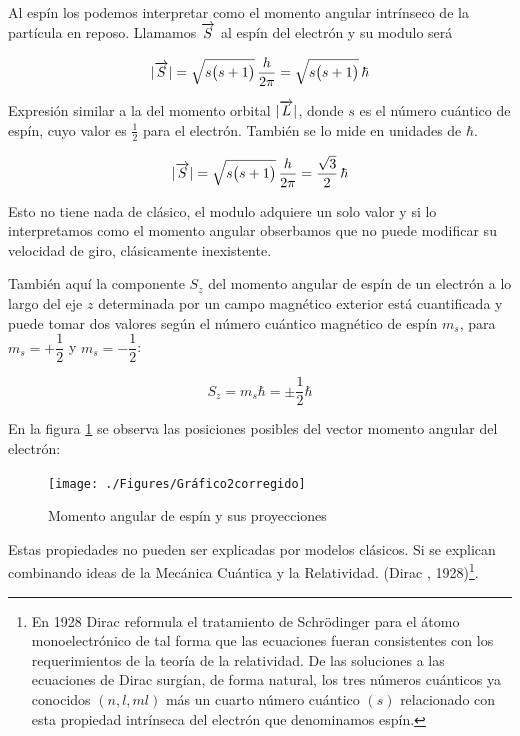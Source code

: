 Al espín los podemos interpretar como el momento angular intrínseco de la partícula en reposo. Llamamos $\overrightarrow{S}$ al espín del electrón y su modulo será

\begin{equation}
 |\overrightarrow{S}| = \sqrt{s \big(s+1\big) } \, \frac{h}{2 \pi } = \sqrt{s \big(s+1\big) } \,\hbar 
\end{equation}

Expresión similar a la del momento orbital $|\overrightarrow{L}|$, donde $s$ es el número cuántico de espín, cuyo valor es $\frac{1}{2}$ para el electrón. También se lo mide en unidades de $\hbar$.
 
\begin{equation}
 |\overrightarrow{S}| = \sqrt{s \big(s+1\big) } \, \frac{h}{2 \pi } = \frac{\sqrt{3}}{2}\, \hbar
\end{equation}

Esto no tiene nada de clásico, el modulo adquiere un solo valor y si lo interpretamos como el momento angular obserbamos que no puede modificar su velocidad de giro, clásicamente inexistente.

También aquí la componente $S_{z}$ del momento angular de espín de un electrón a lo largo del eje $z$ determinada por un campo magnético exterior está cuantificada y puede tomar dos valores según el número cuántico magnético de espín $m_{s}$, para $m_{s}=+\dfrac{1}{2}$ y $m_{s}=-\dfrac{1}{2}$:

\begin{equation}
 S_{z} = m_{s} \hbar = \pm \frac{1}{2} \hbar
\end{equation}

En la figura \ref{fig:Gráfico2corregido} se observa las posiciones posibles del vector momento angular del electrón:

\begin{figure}[H]
    \centering
    \texttt{[image: ./Figures/Gráfico2corregido]}
	\caption{Momento angular de espín y sus proyecciones}
	\label{fig:Gráfico2corregido}
\end{figure}

Estas propiedades no pueden ser explicadas por modelos clásicos. Si se explican combinando ideas de la Mecánica Cuántica y la Relatividad. (Dirac , 1928)\footnote{En 1928 Dirac reformula el tratamiento de Schrödinger para el átomo monoelectrónico de tal forma que las ecuaciones fueran consistentes con los requerimientos de la teoría de la relatividad. De las soluciones a las ecuaciones de Dirac surgían, de forma natural, los tres números cuánticos ya conocidos $(n, l, ml)$ más un cuarto número cuántico $(s)$ relacionado con esta propiedad intrínseca del electrón que denominamos espín.}.











